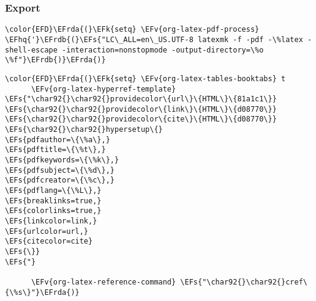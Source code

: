 \documentclass[c]{article}
\theoremstyle{plain}%
\theoremstyle{definition}
\theoremstyle{remark}
\newcommand{\EFs}[1]{\textcolor{EFs}{#1}} %
\newcommand{\EFk}[1]{\textcolor{EFk}{#1}} %
\newcommand{\EFv}[1]{\textcolor{EFv}{#1}} %
\newcommand{\EFhq}[1]{\textcolor{EFhq}{#1}} %
\newcommand{\EFrda}[1]{\textcolor{EFrda}{#1}} %
\newcommand{\EFrdb}[1]{\textcolor{EFrdb}{#1}} %
\begin{document}
\subsubsection{Export}
\label{sec:org79545bf}
\begin{Code}
\begin{Verbatim}
\color{EFD}\EFrda{(}\EFk{setq} \EFv{org-latex-pdf-process} \EFhq{'}\EFrdb{(}\EFs{"LC\_ALL=en\_US.UTF-8 latexmk -f -pdf -\%latex -shell-escape -interaction=nonstopmode -output-directory=\%o \%f"}\EFrdb{)}\EFrda{)}
\end{Verbatim}
\end{Code}
\begin{Code}
\begin{Verbatim}
\color{EFD}\EFrda{(}\EFk{setq} \EFv{org-latex-tables-booktabs} t
      \EFv{org-latex-hyperref-template} \EFs{"\char92{}\char92{}providecolor\{url\}\{HTML\}\{81a1c1\}}
\EFs{\char92{}\char92{}providecolor\{link\}\{HTML\}\{d08770\}}
\EFs{\char92{}\char92{}providecolor\{cite\}\{HTML\}\{d08770\}}
\EFs{\char92{}\char92{}hypersetup\{}
\EFs{pdfauthor=\{\%a\},}
\EFs{pdftitle=\{\%t\},}
\EFs{pdfkeywords=\{\%k\},}
\EFs{pdfsubject=\{\%d\},}
\EFs{pdfcreator=\{\%c\},}
\EFs{pdflang=\{\%L\},}
\EFs{breaklinks=true,}
\EFs{colorlinks=true,}
\EFs{linkcolor=link,}
\EFs{urlcolor=url,}
\EFs{citecolor=cite}
\EFs{\}}
\EFs{"}

      \EFv{org-latex-reference-command} \EFs{"\char92{}\char92{}cref\{\%s\}"}\EFrda{)}
\end{Verbatim}
\end{Code}
\end{document}
